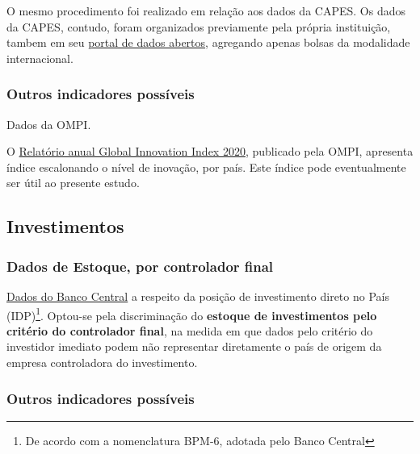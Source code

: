 \documentclass[
]{article}
\begin{document}
O mesmo procedimento foi realizado em relação aos dados da CAPES. Os
dados da CAPES, contudo, foram organizados previamente pela própria
instituição, tambem em seu
\href{https://dadosabertos.capes.gov.br/organization/11b0c6b9-fe2e-4cb1-89a1-6e481a1c7b29?res_format=CSV\&groups=bolsas-ativas-em-programas-de-mobilidade-internacional\&organization=bolsas-e-auxilios}{portal
de dados abertos}, agregando apenas bolsas da modalidade internacional.

\hypertarget{outros-indicadores-possuxedveis}{%
\subsubsection{Outros indicadores
possíveis}\label{outros-indicadores-possuxedveis}}

Dados da OMPI.

O
\href{https://www.wipo.int/edocs/pubdocs/en/wipo_pub_gii_2020.pdf}{Relatório
anual Global Innovation Index 2020}, publicado pela OMPI, apresenta
índice escalonando o nível de inovação, por país. Este índice pode
eventualmente ser útil ao presente estudo.

\hypertarget{investimentos}{%
\subsection{Investimentos}\label{investimentos}}

\hypertarget{dados-de-estoque-por-controlador-final}{%
\subsubsection{Dados de Estoque, por controlador
final}\label{dados-de-estoque-por-controlador-final}}

\href{https://www.bcb.gov.br/content/estatisticas/Documents/Tabelas_especiais/TabelasCompletasPosicaoIDP.xlsx}{Dados
do Banco Central} a respeito da posição de investimento direto no País
(IDP)\footnote{De acordo com a nomenclatura BPM-6, adotada pelo Banco
  Central}. Optou-se pela discriminação do \textbf{estoque de
investimentos pelo critério do controlador final}, na medida em que
dados pelo critério do investidor imediato podem não representar
diretamente o país de origem da empresa controladora do investimento.

\hypertarget{outros-indicadores-possuxedveis-1}{%
\subsubsection{Outros indicadores
possíveis}\label{outros-indicadores-possuxedveis-1}}
\end{document}
